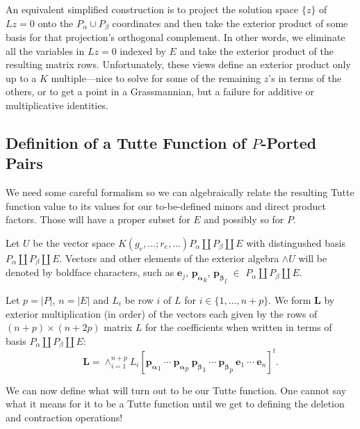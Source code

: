 \documentclass[Unicode]{cedram-alco}
\newcommand{\ext}[1]{\ensuremath{\mathbf{#1}}}
\newcommand{\dunion}{\coprod}
\begin{document}
An equivalent simplified construction is to project the solution space $\{z\}$ of $Lz=0$ onto
the $P_\alpha\cup P_\beta$ coordinates and then take the exterior product of some basis
for that projection's orthogonal complement.  In other words, we eliminate all the variables
in $Lz=0$ indexed by $E$ and take the exterior product of the resulting matrix rows.
Unfortunately, these views define an exterior product only
up to a $K$ multiple---nice to solve for some of the remaining $z$'s in terms of
the others, or to get a point in a Grassmannian, but a failure
for additive or multiplicative identities.


\subsection{Definition of a Tutte Function of $P$-Ported Pairs}


We need 
some careful formalism so we can algebraically relate the resulting Tutte function value
to its values for our to-be-defined minors and direct product factors.  Those 
will have a proper subset for $E$ and possibly so for $P$.

Let $U$ be the vector space $K(g_e,\ldots;r_e,\ldots)P_\alpha
\dunion P_\beta \dunion E$ with distingushed basis $P_\alpha
\dunion P_\beta \dunion E$.  Vectors and other elements of the
exterior algebra $\wedge U$ will be denoted by boldface
characters, such as $\ext{e}_j$, $\ext{p_\alpha}_k$,
$\ext{p_\beta}_l$ $\in$ $P_\alpha \dunion P_\beta \dunion E$.
    
Let $p = |P|$, $n=|E|$ and $L_i$ be row $i$ of $L$ for $i\in\{1,\ldots,n+p\}$.
We form $\ext{L}$ by exterior multiplication (in order) of the vectors each given by the
rows of $(n+p)\times (n+2p)$ matrix $L$ for the coefficients when written in terms of
basis $P_\alpha \dunion P_\beta \dunion E$:
\begin{equation}\label{defExtL}
  \ext{L} = \wedge_{i=1}^{n+p}L_i[\ext{p_\alpha}_1\ \cdots\ \ext{p_\alpha}_{p}\ \ext{p_\beta}_1\ \cdots\ \ext{p_\beta}_{p}\
    \ext{e}_1\ \cdots\ \ext{e}_{n}]^t. 
\end{equation}

We can now define what will turn out to be our Tutte function.  One cannot say what it means for
it to be a Tutte function until we get to defining the deletion and contraction operations!
\end{document}

